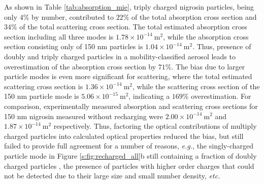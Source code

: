 As shown in Table \ref{tab:absorption_mie}, triply charged nigrosin particles, being only $4\%$ by number, contributed to $22\%$ of the total absorption cross section and $34\%$ of the total scattering cross section. The total estimated absorption cross section including all three modes is $1.78\times 10^{-14}\ \mathrm{m}^2$, while the absorption cross section consisting only of 150 nm particles is $1.04\times 10^{-14}\ \mathrm{m}^2$. Thus, presence of doubly and triply charged particles in a mobility-classified aerosol leads to overestimation of the absorption cross section by $71\%$. The bias due to larger particle modes is even more significant for scattering, where the total estimated scattering cross section is $1.36\times 10^{-14}\ \mathrm{m}^2$, while the scattering cross section of the 150 nm particle mode is $5.06\times 10^{-15}\ \mathrm{m}^2$, indicating a $169\%$ overestimation. For comparison, experimentally measured absorption and scattering cross sections for 150 nm nigrosin measured without recharging were $2.00\times 10^{-14}\ \mathrm{m}^2$ and $1.87\times 10^{-14}\ \mathrm{m}^2$ respectively. Thus, factoring the optical contributions of multiply charged particles into calculated optical properties reduced the bias, but still failed to provide full agreement for a number of reasons, \textit{e.g.}, the singly-charged particle mode in Figure \ref{s:fig:recharged_all}b still containing a fraction of doubly charged particles \citep{RN7}, the presence of particles with higher order charges that could not be detected due to their large size and small number density, \textit{etc.}

